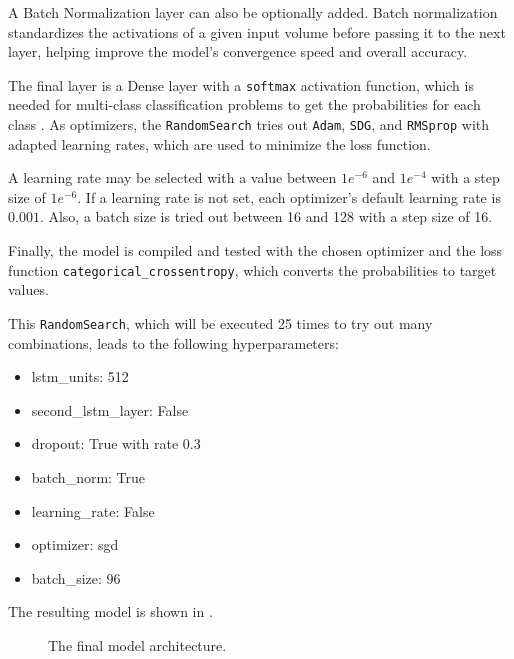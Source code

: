 A Batch Normalization layer can also be optionally added.
Batch normalization standardizes the activations of a given input volume before passing it to the next layer, helping improve the model's convergence speed and overall accuracy.

The final layer is a Dense layer with a \texttt{softmax} activation function, which is needed for multi-class classification problems to get the probabilities for each class \cite{cat_cross_entropy}.
As optimizers, the \texttt{RandomSearch} tries out \texttt{Adam}, \texttt{SDG}, and \texttt{RMSprop} with adapted learning rates, which are used to minimize the loss function.

A learning rate may be selected with a value between \(1e^{-6}\) and \(1e^{-4}\) with a step size of \(1e^{-6}\).
If a learning rate is not set, each optimizer's default learning rate is \(0.001\).
Also, a batch size is tried out between 16 and 128 with a step size of 16.

Finally, the model is compiled and tested with the chosen optimizer and the loss function \texttt{categorical\_crossentropy}, which converts the probabilities to target values.

This \texttt{RandomSearch}, which will be executed 25 times to try out many combinations, leads to the following hyperparameters:
\begin{itemize}
    \item lstm\_units: 512
    \item second\_lstm\_layer: False
    \item dropout: True with rate 0.3
    \item batch\_norm: True
    \item learning\_rate: False
    \item optimizer: sgd
    \item batch\_size: 96
\end{itemize}

The resulting model is shown in .
\begin{figure}[h!]
    \centering
    
    \caption{The final model architecture.}
    \label{final_model}
\end{figure}
